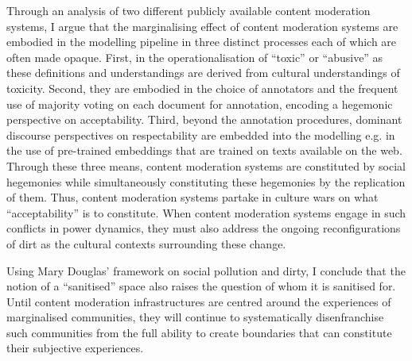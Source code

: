 Through an analysis of two different publicly available content moderation systems, I argue that the marginalising effect of content moderation systems are embodied in the modelling pipeline in three distinct processes each of which are often made opaque.
First, in the operationalisation of ``toxic'' or ``abusive'' as these definitions and understandings are derived from cultural understandings of toxicity.
Second, they are embodied in the choice of annotators and the frequent use of majority voting on each document for annotation, encoding a hegemonic perspective on acceptability.
Third, beyond the annotation procedures, dominant discourse perspectives on respectability are embedded into the modelling e.g. in the use of pre-trained embeddings that are trained on texts available on the web.
Through these three means, content moderation systems are constituted by social hegemonies while simultaneously constituting these hegemonies by the replication of them.
Thus, content moderation systems partake in culture wars on what ``acceptability'' is to constitute.
When content moderation systems engage in such conflicts in power dynamics, they must also address the ongoing reconfigurations of dirt as the cultural contexts surrounding these change.

Using Mary Douglas' framework on social pollution and dirty, I conclude that the notion of a ``sanitised'' space also raises the question of whom it is sanitised for.
Until content moderation infrastructures are centred around the experiences of marginalised communities, they will continue to systematically disenfranchise such communities from the full ability to create boundaries that can constitute their subjective experiences.











